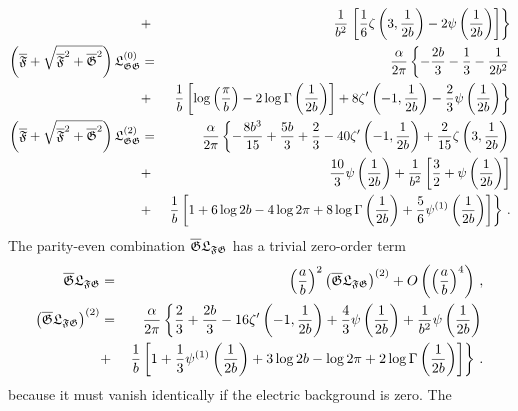 \documentclass[12pt]{article}
\begin{document}
\begin{appendices}
\begin{eqnarray}
&+&\frac{1}{b^{2}}\left. \left[ \frac{1}{6}\zeta \left( 3,\frac{1}{2b}%
\right) -2\psi \left( \frac{1}{2b}\right) \right] \right\}  \notag \\
\left( \overline{\mathfrak{F}}+\sqrt{\overline{\mathfrak{F}}^{2}+\overline{%
\mathfrak{G}}^{2}}\right) \mathfrak{L}_{\mathfrak{GG}}^{\left( 0\right) } &=&%
\frac{\alpha }{2\pi }\left\{ -\frac{2b}{3}-\frac{1}{3}-\frac{1}{2b^{2}}%
\right.  \notag \\
&+&\left. \frac{1}{b}\left[ \log \left( \frac{\pi }{b}\right) -2\log \Gamma
\left( \frac{1}{2b}\right) \right] +8\zeta ^{\prime }\left( -1,\frac{1}{2b}%
\right) -\frac{2}{3}\psi \left( \frac{1}{2b}\right) \right\}  \notag \\
\left( \overline{\mathfrak{F}}+\sqrt{\overline{\mathfrak{F}}^{2}+\overline{%
\mathfrak{G}}^{2}}\right) \mathfrak{L}_{\mathfrak{GG}}^{\left( 2\right) } &=&%
\frac{\alpha }{2\pi }\left\{ -\frac{8b^{3}}{15}+\frac{5b}{3}+\frac{2}{3}%
-40\zeta ^{\prime }\left( -1,\frac{1}{2b}\right) +\frac{2}{15}\zeta \left( 3,%
\frac{1}{2b}\right) \right.  \notag \\
&+&\frac{10}{3}\psi \left( \frac{1}{2b}\right) +\frac{1}{b^{2}}\left[ \frac{3%
}{2}+\psi \left( \frac{1}{2b}\right) \right]  \notag \\
&+&\left. \frac{1}{b}\left[ 1+6\log 2b-4\log 2\pi +8\log \Gamma \left( \frac{%
1}{2b}\right) +\frac{5}{6}\psi ^{\left( 1\right) }\left( \frac{1}{2b}\right) %
\right] \right\} \,.  \label{apb2}
\end{eqnarray}%
The parity-even combination $\overline{\mathfrak{G}}\mathfrak{L}_{\mathfrak{%
FG}}$ has a trivial zero-order term%
\begin{eqnarray}
\overline{\mathfrak{G}}\mathfrak{L}_{\mathfrak{FG}} &=&\left( \frac{a}{b}%
\right) ^{2}\left( \overline{\mathfrak{G}}\mathfrak{L}_{\mathfrak{FG}%
}\right) ^{\left( 2\right) }+O\left( \left( \frac{a}{b}\right) ^{4}\right)
\,,  \notag \\
\left( \overline{\mathfrak{G}}\mathfrak{L}_{\mathfrak{FG}}\right) ^{\left(
2\right) } &=&\frac{\alpha }{2\pi }\left\{ \frac{2}{3}+\frac{2b}{3}-16\zeta
^{\prime }\left( -1,\frac{1}{2b}\right) +\frac{4}{3}\psi \left( \frac{1}{2b}%
\right) +\frac{1}{b^{2}}\psi \left( \frac{1}{2b}\right) \right.  \notag \\
&+&\left. \frac{1}{b}\left[ 1+\frac{1}{3}\psi ^{\left( 1\right) }\left( 
\frac{1}{2b}\right) +3\log 2b-\log 2\pi +2\log \Gamma \left( \frac{1}{2b}%
\right) \right] \right\} \,.  \label{apb4}
\end{eqnarray}%
because it must vanish identically if the electric background is zero. The

\end{appendices}
\end{document}
